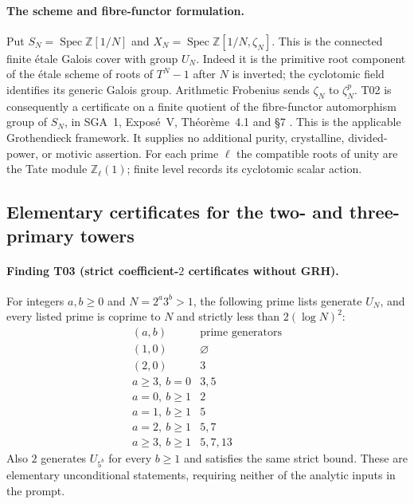 \paragraph{The scheme and fibre-functor formulation.}
Put $S_N=\operatorname{Spec}\mathbb Z[1/N]$ and
$X_N=\operatorname{Spec}\mathbb Z[1/N,\zeta_N]$. This is the connected
finite \'etale Galois cover with group $U_N$. Indeed it is the primitive
root component of the \'etale scheme of roots of $T^N-1$ after $N$ is
inverted; the cyclotomic field identifies its generic Galois group.
Arithmetic Frobenius sends $\zeta_N$ to $\zeta_N^p$. T02 is consequently
a certificate on a finite quotient of the fibre-functor automorphism
group of $S_N$, in SGA~1, Expos\'e~V, Th\'eor\`eme~4.1 and \S7
\cite{SGA1}. This is the applicable Grothendieck framework. It supplies
no additional purity, crystalline, divided-power, or motivic assertion.
For each prime $\ell$ the compatible roots of unity are the Tate module
$\mathbb Z_\ell(1)$; finite level records its cyclotomic scalar action.

\subsection{Elementary certificates for the two- and three-primary towers}

\paragraph{Finding T03 (strict coefficient-$2$ certificates without GRH).}
For integers $a,b\geq0$ and $N=2^a3^b>1$, the following prime lists generate $U_N$, and every
listed prime is coprime to $N$ and strictly less than $2(\log N)^2$:
\[
\begin{array}{c|c}
 (a,b)&\text{prime generators}\\\hline
 (1,0)&\varnothing\\
 (2,0)&3\\
 a\geq3,\ b=0&3,5\\
 a=0,\ b\geq1&2\\
 a=1,\ b\geq1&5\\
 a=2,\ b\geq1&5,7\\
 a\geq3,\ b\geq1&5,7,13
\end{array}
 \tag{T03}
\]
Also $2$ generates $U_{5^b}$ for every $b\geq1$ and satisfies the same
strict bound. These are elementary unconditional statements, requiring
neither of the analytic inputs in the prompt.

